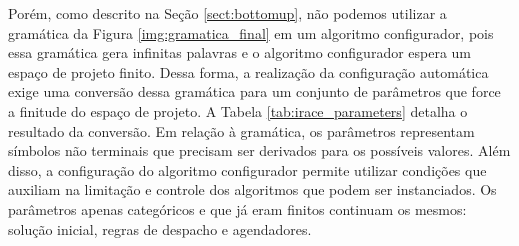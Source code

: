 Porém, como descrito na Seção \ref{sect:bottomup}, não podemos utilizar a gramática da Figura \ref{img:gramatica_final} em um algoritmo configurador, pois essa gramática gera infinitas palavras e o algoritmo configurador espera um espaço de projeto finito. Dessa forma, a realização da configuração automática exige uma conversão dessa gramática para um conjunto de parâmetros que force a finitude do espaço de projeto. A Tabela \ref{tab:irace_parameters} detalha o resultado da conversão. Em relação à gramática, os parâmetros representam símbolos não terminais que precisam ser derivados para os possíveis valores. Além disso, a configuração do algoritmo configurador permite utilizar condições que auxiliam na limitação e controle dos algoritmos que podem ser instanciados. Os parâmetros apenas categóricos e que já eram finitos continuam os mesmos: solução inicial, regras de despacho e agendadores.

